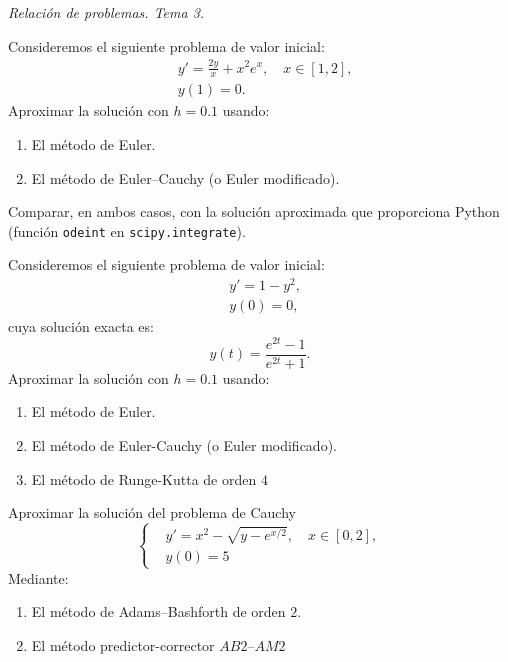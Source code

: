 \documentclass[11pt]{article}
\begin{document}
\begin{flushright}
  \LARGE\it Relación de problemas. Tema \huge 3.\\
  \bigskip
\end{flushright}

\begin{problemas}

  \begin{problema}
    Consideremos el siguiente problema de valor inicial:
    \begin{align*}
      &y'=\frac{2y}{x} + x^2e^x, \quad x\in[1,2],\\
      &y(1)=0.
    \end{align*}
    Aproximar la solución con $h=0.1$ usando:
    \begin{enumerate}
    \item El método de Euler.
    \item El método de Euler--Cauchy (o Euler modificado).
    \end{enumerate}
    Comparar, en ambos casos, con la solución aproximada que
    proporciona Python (función \texttt{odeint} en
    \texttt{scipy.integrate}).
  \end{problema}
  
  \begin{problema}%
    Consideremos el siguiente problema de valor inicial:
    \begin{align*}
      &y'=1-y^2,\\
      &y(0)=0,
    \end{align*}
    cuya solución exacta es:
    $$ y(t) = \frac{e^{2t}-1}{e^{2t}+1}.$$
    Aproximar la solución con $h=0.1$ usando:
    \begin{enumerate}
    \item El método de Euler.
    \item El método de Euler-Cauchy (o Euler
      modificado).
    \item El método de Runge-Kutta de orden $4$
    \end{enumerate}
  \end{problema}

  \begin{problema}
    Aproximar la solución del problema de Cauchy
    \begin{equation*}
      \left\{
      \begin{aligned}
        &y'=x^2 - \sqrt{y-e^{x/2}}, \quad x\in[0,2], \\
        &y(0)=5
      \end{aligned}
      \right.
    \end{equation*}
    Mediante:
    \begin{enumerate}
    \item El método de Adams--Bashforth de orden $2$.
    \item El método predictor-corrector $AB2$--$AM2$
    \end{enumerate}
  \end{problema}
  
  \end{problemas}
\end{document}
